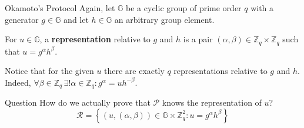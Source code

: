 \documentclass{zkdl-presentation-template}
\begin{document}
    \begin{frame}{Okamoto's Protocol}
        Again, let $\mathbb{G}$ be a cyclic group of prime order $q$ with a generator $g \in \mathbb{G}$ and let $h \in \mathbb{G}$ an arbitrary group element.\pause

        \begin{definition}
            For $u \in \mathbb{G}$, a \textbf{representation} relative to $g$ and $h$ is a pair $(\alpha,\beta) \in \mathbb{Z}_q \times \mathbb{Z}_q$ such that $u=g^{\alpha}h^{\beta}$.
        \end{definition}
        \pause

        \begin{remark}
            Notice that for the given $u$ there are exactly $q$ representations relative to $g$ and $h$. Indeed, $\forall \beta \in \mathbb{Z}_q \, \exists! \alpha \in \mathbb{Z}_q: g^{\alpha} = uh^{-\beta}$.
        \end{remark}
        \pause

        \begin{questionblock}{Question}
            How do we actually prove that $\mathcal{P}$ knows the representation of $u$?
            \begin{equation*}
                \mathcal{R} = \left\{ (u,(\alpha,\beta)) \in \mathbb{G} \times \mathbb{Z}_q^2: u = g^{\alpha}h^{\beta} \right\}
            \end{equation*}
        \end{questionblock}
    \end{frame}
\end{document}
